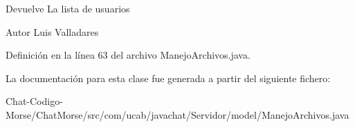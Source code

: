 \begin{DoxyReturn}{Devuelve}
La lista de usuarios 
\end{DoxyReturn}
\begin{DoxyAuthor}{Autor}
Luis Valladares 
\end{DoxyAuthor}


Definición en la línea 63 del archivo Manejo\-Archivos.\-java.



La documentación para esta clase fue generada a partir del siguiente fichero\-:\begin{DoxyCompactItemize}
\item 
Chat-\/\-Codigo-\/\-Morse/\-Chat\-Morse/src/com/ucab/javachat/\-Servidor/model/Manejo\-Archivos.\-java\end{DoxyCompactItemize}
